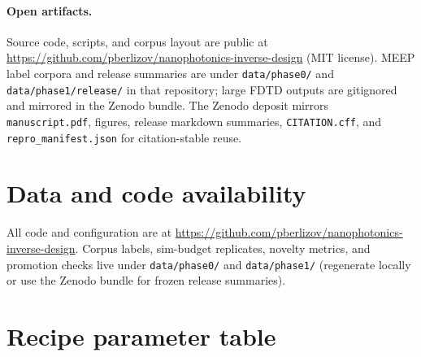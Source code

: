 \documentclass[11pt,a4paper]{article}
\begin{document}
\paragraph{Open artifacts.}
Source code, scripts, and corpus layout are public at \url{https://github.com/pberlizov/nanophotonics-inverse-design} (MIT license).
MEEP label corpora and release summaries are under \texttt{data/phase0/} and \texttt{data/phase1/release/} in that repository; large FDTD outputs are gitignored and mirrored in the Zenodo bundle.
The Zenodo deposit mirrors \texttt{manuscript.pdf}, figures, release markdown summaries, \texttt{CITATION.cff}, and \texttt{repro\_manifest.json} for citation-stable reuse.

\section*{Data and code availability}

All code and configuration are at \url{https://github.com/pberlizov/nanophotonics-inverse-design}.
Corpus labels, sim-budget replicates, novelty metrics, and promotion checks live under \texttt{data/phase0/} and \texttt{data/phase1/} (regenerate locally or use the Zenodo bundle for frozen release summaries).

\appendix
\section{Recipe parameter table}
\label{app:recipe}
\end{document}
